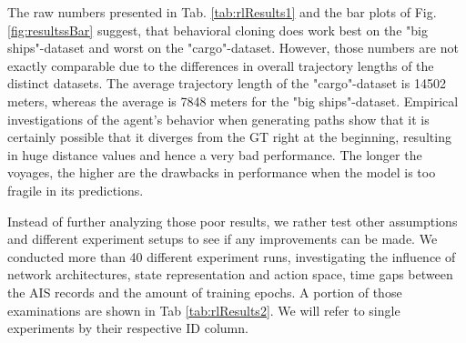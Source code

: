 The raw numbers presented in Tab. \ref{tab:rlResults1} and the bar plots of Fig. \ref{fig:resultssBar} suggest, that behavioral cloning does work best on the "big ships"-dataset and worst on the "cargo"-dataset. However, those numbers are not exactly comparable due to the differences in overall trajectory lengths of the distinct datasets. The average trajectory length of the "cargo"-dataset is 14502 meters, whereas the average is 7848 meters for the "big ships"-dataset. Empirical investigations of the agent's behavior when generating paths show that it is certainly possible that it diverges from the GT right at the beginning, resulting in huge distance values and hence a very bad performance. The longer the voyages, the higher are the drawbacks in performance when the model is too fragile in its predictions.
\par
Instead of further analyzing those poor results, we rather test other assumptions and different experiment setups to see if any improvements can be made. We conducted more than 40 different experiment runs, investigating the influence of network architectures, state representation and action space, time gaps between the AIS records and the amount of training epochs. A portion of those examinations are shown in Tab \ref{tab:rlResults2}. We will refer to single experiments by their respective ID column.
